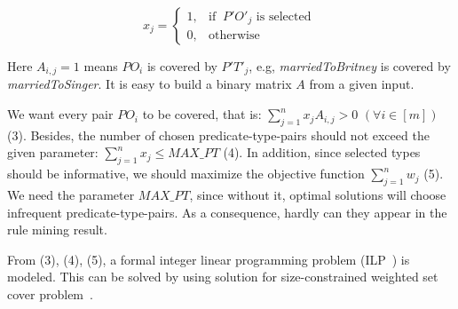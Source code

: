 \documentclass{acm_proc_article-sp}
\begin{document}
\begin{equation}
    x_{j} =
    \begin{cases}
      1, & \text{if }\ P'O'_{j} \text{ is selected}\ \\
      0, & \text{otherwise}
    \end{cases}
\end{equation}

Here $A_{i,j} = 1$ means $PO_{i}$ is covered by $P'T'_{j}$, e.g, \textit{marriedToBritney} is covered by \textit{marriedToSinger}. It is easy to build a binary matrix $A$ from a given input.

We want every pair $PO_{i}$ to be covered, that is: $\sum_{j=1}^{n}{x_{j} A_{i,j}} > 0$ $(\forall i \in [m])$ (3). Besides, the number of chosen predicate-type-pairs should not exceed the given parameter: $\sum_{j=1}^{n}{x_{j}} \leq MAX\_PT$ (4). In addition, since selected types should be informative, we should maximize the objective function $\sum_{j=1}^{n}{w_{j}}$ (5). We need the parameter $MAX\_PT$, since without it, optimal solutions will choose infrequent predicate-type-pairs. As a consequence, hardly can they appear in the rule mining result.

From (3), (4), (5), a formal integer linear programming problem (ILP~\cite{ref1}) is modeled. This can be solved by using solution for size-constrained weighted set cover problem~\cite{ref3}.



\end{document}
